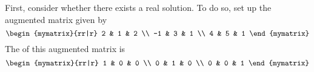 \begin{solution}
First, consider whether there exists a real solution. To do so, set up the augmented matrix given by
\begin{equation*}
\begin{mymatrix}{rr|r}
2 & 1 & 2 \\ 
-1 & 3 & 1 \\ 
4 & 5 & 1
\end{mymatrix}
\end{equation*}
The {\rref} of this augmented matrix is 
\begin{equation*}
\begin{mymatrix}{rr|r}
1 & 0 & 0 \\ 
0 & 1 & 0 \\ 
0 & 0 & 1
\end{mymatrix}
\end{equation*}


\end{solution}
